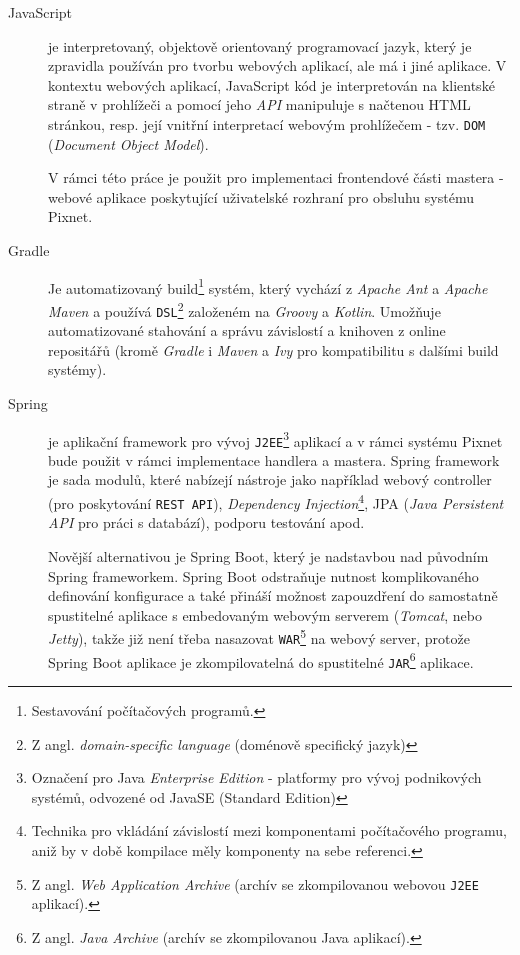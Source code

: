 \begin{description}
    \item[JavaScript] je interpretovaný, objektově orientovaný programovací jazyk, který je zpravidla používán pro tvorbu webových aplikací, ale má i jiné aplikace. V kontextu webových aplikací, JavaScript kód je interpretován na klientské straně v prohlížeči a pomocí jeho \textit{API} manipuluje s načtenou HTML stránkou, resp. její vnitřní interpretací webovým prohlížečem - tzv. \texttt{DOM} (\textit{Document Object Model}).
    
    V rámci této práce je použit pro implementaci frontendové části mastera - webové aplikace poskytující uživatelské rozhraní pro obsluhu systému Pixnet.
     
    \item[Gradle] Je automatizovaný build\footnote{Sestavování počítačových programů.} systém, který vychází z \textit{Apache Ant} a \textit{Apache Maven} a používá \texttt{DSL}\footnote{Z angl. \textit{domain-specific language} (doménově specifický jazyk)} založeném na \textit{Groovy} a \textit{Kotlin}. Umožňuje automatizované stahování a správu závislostí a knihoven z online repositářů (kromě \textit{Gradle} i \textit{Maven} a \textit{Ivy} pro kompatibilitu s dalšími build systémy).
    
    \item[Spring] je aplikační framework pro vývoj \texttt{J2EE}\footnote{Označení pro Java \textit{Enterprise Edition} - platformy pro vývoj podnikových systémů, odvozené od JavaSE (Standard Edition)} aplikací a v rámci systému Pixnet bude použit v rámci implementace handlera a mastera. Spring framework je sada modulů, které nabízejí nástroje jako například webový controller (pro poskytování \texttt{REST API}), \textit{Dependency Injection}\footnote{Technika pro vkládání závislostí mezi komponentami počítačového programu, aniž by v době kompilace měly komponenty na sebe referenci.}, JPA (\textit{Java Persistent API} pro práci s databází), podporu testování apod.

    Novější alternativou je Spring Boot, který je nadstavbou nad původním Spring frameworkem. Spring Boot odstraňuje nutnost komplikovaného definování konfigurace a také přináší možnost zapouzdření do samostatně spustitelné aplikace s embedovaným webovým serverem (\textit{Tomcat}, nebo \textit{Jetty}), takže již není třeba nasazovat \texttt{WAR}\footnote{Z angl. \textit{Web Application Archive} (archív se zkompilovanou webovou \texttt{J2EE} aplikací).} na webový server, protože Spring Boot aplikace je zkompilovatelná do spustitelné \texttt{JAR}\footnote{Z angl. \textit{Java Archive} (archív se zkompilovanou Java aplikací).} aplikace.
    

\end{description}
